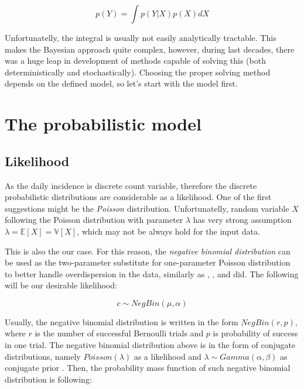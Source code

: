 \documentclass[
  digital, %
  oneside, %
  lof,     %
  lot,     %
]{fithesis4}
\begin{document}
\begin{equation}
p(Y) = \int p( Y | X ) p(X) dX
\end{equation}

Unfortunatelly, the integral is usually not easily 
analytically tractable. 
This makes the Bayesian approach quite complex, 
however, during last decades, there was a huge leap 
in development of methods capable of solving this 
(both deterministically and stochastically). 
Choosing the proper solving method depends on the 
defined model, so let's start with the model first.


\section{The probabilistic model}

\subsection{Likelihood}

As the daily incidence is discrete count variable, 
therefore the discrete probabilistic distributions are 
considerable as a likelihood. One of the first suggestions 
might be the \textit{Poisson} distribution. Unfortunatelly, random 
variable $X$ following the Poisson distribution with 
parameter $\lambda$ has very strong assumption 
$\lambda = \mathbb{E}\left[ X \right] = \mathbb{V}\left[ X \right]$, 
which may not be always hold for the input data. 

This is also the our case. 
For this reason, the \textit{negative binomial distribution} can 
be used as the two-parameter substitute for 
one-parameter Poisson distribution to better 
handle overdispersion in the data, similarly 
as \cite{simone2020}, \cite{wallinga2004}, 
\cite{alzahrani2018} and \cite{manevski2020} did.
The following will be our desirable likelihood:

\begin{equation}
c \sim NegBin\left( \mu, \alpha \right)
\end{equation}

Usually, the negative binomial distribution is 
written in the form $NegBin \left( r, p \right)$, 
where $r$ is the number of successful Bernoulli 
trials and $p$ is probability of success in one 
trial. The negative binomial distribution above 
is in the form of conjugate distributions, namely 
$Poisson\left( \lambda \right)$ as a likelihood 
and $\lambda \sim Gamma\left( \alpha, \beta \right)$ as 
conjugate prior \cite{munezero2020}. 
Then, the probability mass function of such 
negative binomial distribution is following:
\end{document}

